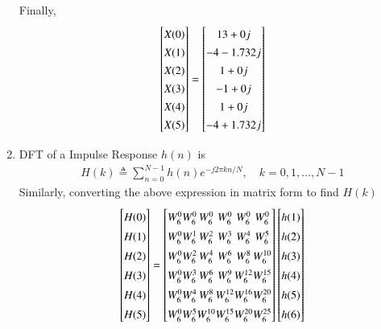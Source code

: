 \documentclass[journal,12pt,twocolumn]{IEEEtran}
\renewcommand\thesection{\arabic{section}}
\begin{document}
\begin{enumerate}[label=\thesection.\arabic*.,ref=\thesection.\theenumi]
Finally,
\begin{equation}
\renewcommand{\arraystretch}{1.35}
\setlength\arraycolsep{0.01pt}
\begin{bmatrix} 
X(0) \\ X(1) \\ X(2) \\ X(3) \\ X(4) \\ X(5) 
\end{bmatrix}
=
\begin{bmatrix}
13+0j \\ -4-1.732j \\ 1+0j  \\ -1+0j \\ 1+0j \\ -4+1.732j
\end{bmatrix}
\end{equation}


\item DFT of a Impulse Response $h(n)$ is 
\begin{align}
    H(k) \triangleq \sum_{n=0}^{N-1} h(n) e^{-j 2 \pi k n / N}, \quad k=0,1, \ldots, N-1
\end{align}
Similarly, converting the above expression in matrix form to find $H(k)$
\begin{equation}
\renewcommand{\arraystretch}{1.45}
\setlength\arraycolsep{0.01pt}
\begin{bmatrix} 
H(0) \\ H(1) \\ H(2) \\ H(3) \\ H(4) \\ H(5) 
\end{bmatrix}
=
\begin{bmatrix}
W^{0}_{6} & W^{0}_{6} & W^{0}_{6} & W^{0}_{6} & W^{0}_{6} & W^{0}_{6}\\
W^{0}_{6} & W^{1}_{6} & W^{2}_{6} & W^{3}_{6} & W^{4}_{6} & W^{5}_{6}\\
W^{0}_{6} & W^{2}_{6} & W^{4}_{6} & W^{6}_{6} & W^{8}_{6} & W^{10}_{6}\\
W^{0}_{6} & W^{3}_{6} & W^{6}_{6} & W^{9}_{6} & W^{12}_{6} & W^{15}_{6}\\
W^{0}_{6} & W^{4}_{6} & W^{8}_{6} & W^{12}_{6} & W^{16}_{6} & W^{20}_{6}\\
W^{0}_{6} & W^{5}_{6} & W^{10}_{6} & W^{15}_{6} & W^{20}_{6} & W^{25}_{6}  
\end{bmatrix}
\begin{bmatrix}
h(1) \\ h(2) \\ h(3) \\ h(4) \\ h(5) \\ h(6)
\end{bmatrix}
\end{equation}



\end{enumerate}
\end{document}
